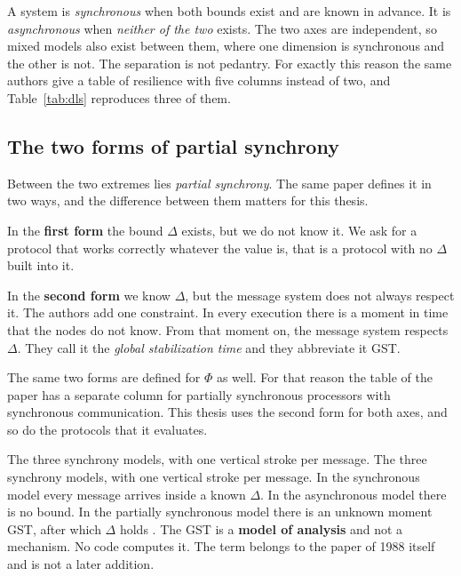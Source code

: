 A system is \emph{synchronous} when both bounds exist and are known in
advance. It is \emph{asynchronous} when \emph{neither of the two}
exists. The two axes are independent, so mixed models also exist between
them, where one dimension is synchronous and the other is not. The
separation is not pedantry. For exactly this reason the same authors
give a table of resilience with five columns instead of two, and
Table~\ref{tab:dls} reproduces three of them.

\subsection{The two forms of partial synchrony}

Between the two extremes lies \emph{partial synchrony}. The same paper
defines it in two ways, and the difference between them matters for this
thesis.

In the \textbf{first form} the bound $\Delta$ exists, but we do not know
it. We ask for a protocol that works correctly whatever the value is,
that is a protocol with no $\Delta$ built into it.

In the \textbf{second form} we know $\Delta$, but the message system
does not always respect it. The authors add one constraint. In every
execution there is a moment in time that the nodes do not know. From
that moment on, the message system respects $\Delta$. They call it the
\emph{global stabilization time} and they abbreviate it GST.

The same two forms are defined for $\Phi$ as well. For that reason the
table of the paper has a separate column for partially synchronous
processors with synchronous communication. This thesis uses the second
form for both axes, and so do the protocols that it evaluates.

%
{The three synchrony models, with one vertical stroke per message.}%
{The three synchrony models, with one vertical stroke per message. In
the synchronous model every message arrives inside a known $\Delta$. In
the asynchronous model there is no bound. In the partially synchronous
model there is an unknown moment GST, after which $\Delta$ holds
\cite{dwork1988consensus}. The GST is a \textbf{model of analysis} and
not a mechanism. No code computes it. The term belongs to the paper of
1988 itself and is not a later addition.}%
{}

